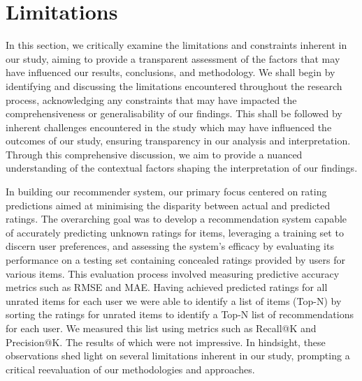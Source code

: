     

\section{Limitations}
\label{sec:Limitations}

In this section, we critically examine the limitations and constraints inherent in our study, aiming to provide a transparent assessment of the factors that may have influenced our results, conclusions, and methodology. We shall begin by identifying and discussing the limitations encountered throughout the research process, acknowledging any constraints that may have impacted the comprehensiveness or generalisability of our findings. This shall be followed by inherent challenges encountered in the study which may have influenced the outcomes of our study, ensuring transparency in our analysis and interpretation. Through this comprehensive discussion, we aim to provide a nuanced understanding of the contextual factors shaping the interpretation of our findings.

In building our recommender system, our primary focus centered on rating predictions aimed at minimising the disparity between actual and predicted ratings. The overarching goal was to develop a recommendation system capable of accurately predicting unknown ratings for items, leveraging a training set to discern user preferences, and assessing the system's efficacy by evaluating its performance on a testing set containing concealed ratings provided by users for various items. This evaluation process involved measuring predictive accuracy metrics such as RMSE and MAE. Having achieved predicted ratings for all unrated items for each user we were able to identify a list of items (Top-N) by sorting the ratings for unrated items to identify a Top-N list of recommendations for each user. We measured this list using metrics such as Recall@K and Precision@K. The results of which were not impressive. In hindsight, these observations shed light on several limitations inherent in our study, prompting a critical reevaluation of our methodologies and approaches.

